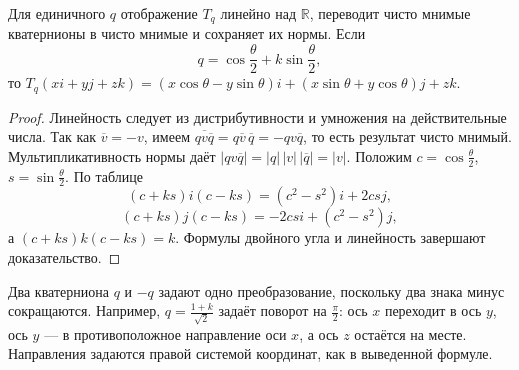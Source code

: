 \begin{theorem}\label{thm:legacy-c24-4}
Для единичного \(q\) отображение \(T_q\) линейно над \(\mathbb R\), переводит чисто мнимые кватернионы в чисто мнимые и сохраняет их нормы. Если
\[
q=\cos\frac\theta2+k\sin\frac\theta2,
\]
то \(T_q(xi+yj+zk)=(x\cos\theta-y\sin\theta)i+(x\sin\theta+y\cos\theta)j+zk\).
\end{theorem}
\begin{proof}
Линейность следует из дистрибутивности и умножения на действительные числа. Так как \(\overline v=-v\), имеем \(\overline{qv\overline q}=q\overline v\,\overline q=-qv\overline q\), то есть результат чисто мнимый. Мультипликативность нормы даёт \(|qv\overline q|=|q|\,|v|\,|\overline q|=|v|\). Положим \(c=\cos\frac\theta2\), \(s=\sin\frac\theta2\). По таблице
\[
(c+ks)i(c-ks)=(c^2-s^2)i+2csj,
\]
\[
(c+ks)j(c-ks)=-2csi+(c^2-s^2)j,
\]
а \((c+ks)k(c-ks)=k\). Формулы двойного угла и линейность завершают доказательство.
\end{proof}
Два кватерниона \(q\) и \(-q\) задают одно преобразование, поскольку два знака минус сокращаются. Например, \(q=\frac{1+k}{\sqrt2}\) задаёт поворот на \(\frac\pi2\): ось \(x\) переходит в ось \(y\), ось \(y\) — в противоположное направление оси \(x\), а ось \(z\) остаётся на месте. Направления задаются правой системой координат, как в выведенной формуле.

